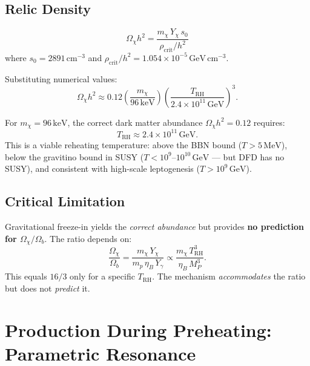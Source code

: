 \documentclass[11pt]{article}
\theoremstyle{definition}
\theoremstyle{remark}
\newcommand{\keV}{\,\mathrm{keV}}
\newcommand{\GeV}{\,\mathrm{GeV}}
\newcommand{\MP}{M_P}
\begin{document}
\subsection{Relic Density}

\begin{equation}
  \Omega_\chi h^2 = \frac{m_\chi\,Y_\chi\,s_0}{\rho_\mathrm{crit}/h^2}
\end{equation}
where $s_0 = 2891\,\mathrm{cm}^{-3}$ and $\rho_\mathrm{crit}/h^2 = 1.054 \times 10^{-5}\GeV\,\mathrm{cm}^{-3}$.

Substituting numerical values:
\begin{equation}
  \Omega_\chi h^2 \approx 0.12
  \left(\frac{m_\chi}{96\keV}\right)
  \left(\frac{T_\mathrm{RH}}{2.4 \times 10^{11}\GeV}\right)^3.
\end{equation}

\begin{tcolorbox}[colback=green!5!white, colframe=green!70!black,
  title=\textbf{Result: Gravitational Freeze-In}]
For $m_\chi = 96\keV$, the correct dark matter abundance
$\Omega_\chi h^2 = 0.12$ requires:
\begin{equation}
  \boxed{T_\mathrm{RH} \approx 2.4 \times 10^{11}\GeV.}
\end{equation}
This is a viable reheating temperature: above the BBN bound ($T > 5\,\mathrm{MeV}$),
below the gravitino bound in SUSY ($T < 10^{9}\text{--}10^{10}\GeV$ --- but
DFD has no SUSY), and consistent with high-scale leptogenesis ($T > 10^9\GeV$).
\end{tcolorbox}

\subsection{Critical Limitation}

Gravitational freeze-in yields the \emph{correct abundance} but provides
\textbf{no prediction for $\Omega_\chi/\Omega_b$}. The ratio depends on:
\begin{equation}
  \frac{\Omega_\chi}{\Omega_b} = \frac{m_\chi\,Y_\chi}{m_p\,\eta_B\,Y_\gamma}
  \propto \frac{m_\chi\,T_\mathrm{RH}^3}{\eta_B\,\MP^3}.
\end{equation}
This equals $16/3$ only for a specific $T_\mathrm{RH}$. The mechanism
\emph{accommodates} the ratio but does not \emph{predict} it.


\section{Production During Preheating: Parametric Resonance}
\label{sec:preheating}
\end{document}

